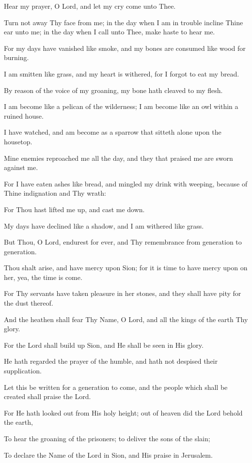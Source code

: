 Hear my prayer, O Lord, and let my cry come unto Thee.

Turn not away Thy face from me; in the day when I am in trouble incline Thine ear unto me; in the day when I call unto Thee, make haste to hear me.

For my days have vanished like smoke, and my bones are consumed like wood for burning.

I am smitten like grass, and my heart is withered, for I forgot to eat my bread.

By reason of the voice of my groaning, my bone hath cleaved to my flesh.

I am become like a pelican of the wilderness; I am become like an owl within a ruined house.

I have watched, and am become as a sparrow that sitteth alone upon the housetop.

Mine enemies reproached me all the day, and they that praised me are sworn against me.

For I have eaten ashes like bread, and mingled my drink with weeping, because of Thine indignation and Thy wrath:

For Thou hast lifted me up, and cast me down.

My days have declined like a shadow, and I am withered like grass.

But Thou, O Lord, endurest for ever, and Thy remembrance from generation to generation.

Thou shalt arise, and have mercy upon Sion; for it is time to have mercy upon on her, yea, the time is come.

For Thy servants have taken pleasure in her stones, and they shall have pity for the dust thereof.

And the heathen shall fear Thy Name, O Lord, and all the kings of the earth Thy glory.

For the Lord shall build up Sion, and He shall be seen in His glory.

He hath regarded the prayer of the humble, and hath not despised their supplication.

Let this be written for a generation to come, and the people which shall be created shall praise the Lord.

For He hath looked out from His holy height; out of heaven did the Lord behold the earth,

To hear the groaning of the prisoners; to deliver the sons of the slain;

To declare the Name of the Lord in Sion, and His praise in Jerusalem.

